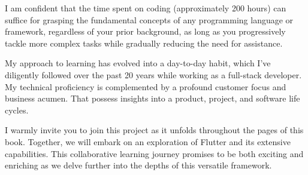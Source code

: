 \vspace{3mm}

\noindent I am confident that the time spent on coding (approximately 200 hours) can suffice for grasping the 
fundamental concepts of any programming language or framework, regardless of your prior background, as long as you 
progressively tackle more complex tasks while gradually reducing the need for assistance.

\vspace{3mm}

\noindent My approach to learning has evolved into a day-to-day habit, which I've diligently followed over the past 
20 years while working as a full-stack developer. My technical proficiency is complemented by a profound customer 
focus and business acumen. That possess insights into a product, project, and software life cycles.

\vspace{3mm}

\noindent I warmly invite you to join this project as it unfolds throughout the pages of this book. Together, we will 
embark on an exploration of Flutter and its extensive capabilities. This collaborative learning journey promises to 
be both exciting and enriching as we delve further into the depths of this versatile framework.


\vspace{1cm}


\newpage
\thispagestyle{empty}
~